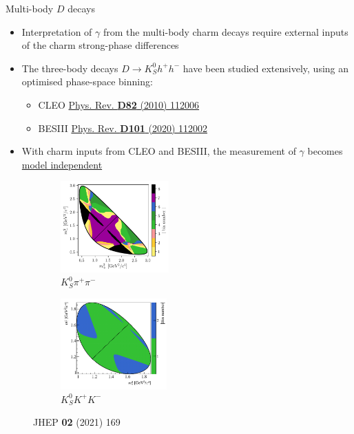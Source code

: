 \documentclass[dvipsnames]{beamer}
\begin{document}
\begin{frame}{Multi-body $D$ decays}
  \begin{itemize}
    \setlength\itemsep{0.5em}
    \item{Interpretation of $\gamma$ from the multi-body charm decays require external inputs of the charm strong-phase differences}
    \item{The three-body decays $D\to K_S^0h^+h^-$ have been studied extensively, using an optimised phase-space binning:}
    \begin{itemize}
      \item{CLEO \href{https://doi.org/10.1103/PhysRevD.82.112006}{Phys. Rev. \textbf{D82} (2010) 112006}}
      \item{BESIII \href{https://journals.aps.org/prd/abstract/10.1103/PhysRevD.101.112002}{Phys. Rev. \textbf{D101} (2020) 112002}}
    \end{itemize}
    \item{With charm inputs from CLEO and BESIII, the measurement of $\gamma$ becomes \underline{model independent}}
  \end{itemize}
  \begin{figure}
    \centering
    \begin{subfigure}{0.5\textwidth}
      \centering
      \includegraphics[height = 3.5cm]{Plots/KsPiPi_optimal.png}
      \vspace{-0.3cm}
      \caption*{$K_S^0\pi^+\pi^-$}
    \end{subfigure}%
    \begin{subfigure}{0.5\textwidth}
      \centering
      \includegraphics[height = 3.5cm]{Plots/KsKK_binning.png}
      \vspace{-0.3cm}
      \caption*{$K_S^0K^+K^-$}
    \end{subfigure}
    \vspace{-0.9cm}
    \caption*{\tiny JHEP \textbf{02} (2021) 169}
  \end{figure}
\end{frame}
\end{document}
